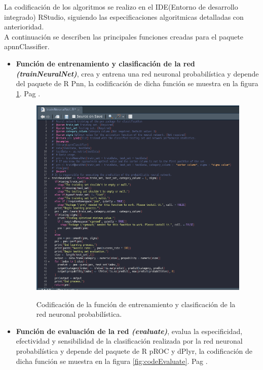 	La codificación de los algoritmos se realizo en el IDE(Entorno de desarrollo integrado) RStudio, siguiendo las especificaciones algoritmicas detalladas con anterioridad.\\

	A continuación se describen las principales funciones creadas para el paquete apnnClassifier.\\
	
\begin{itemize}
\item \textbf{Función de entrenamiento y clasificación de la red \textit{(trainNeuralNet)}}, crea y entrena una red neuronal probabilística y depende del paquete de R Pnn, la codificación de dicha función se muestra en la figura \ref{fig:codeTrainNeuralNet}. Pag \pageref{fig:codeTrainNeuralNet}.

\begin{figure}[h]
	\caption{Codificación de la función de entrenamiento y clasificación de la red neuronal probabilística.}
	\centering
	\includegraphics[scale=0.5]{codeTrainNeuralNet.png}
	\label{fig:codeTrainNeuralNet}
\end{figure}

\item \textbf{Función de evaluación de la red \textit{(evaluate)}}, evalua la especificidad, efectividad y sensibilidad de la clasificación realizada por la red neuronal probabilística y depende del paquete de R pROC y dPlyr, la codificación de dicha función se muestra en la figura \ref{fig:codeEvaluate}. Pag \pageref{fig:codeEvaluate}.


\end{itemize}
